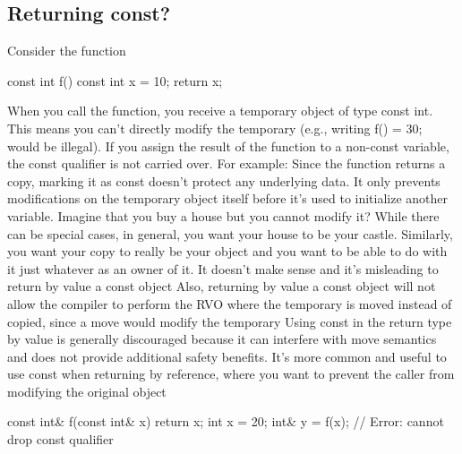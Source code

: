 \documentclass{report}
\begin{document}
\pagebreak 
{}
\bigbreak \noindent 
\subsection{Returning const?}
\bigbreak \noindent 
Consider the function
\bigbreak \noindent 
\begin{cppcode}
    const int f() {
        const int x = 10;
        return x;
    }
\end{cppcode}
\bigbreak \noindent 
When you call the function, you receive a temporary object of type const int. This means you can’t directly modify the temporary (e.g., writing f() = 30; would be illegal).
\bigbreak \noindent 
If you assign the result of the function to a non-const variable, the const qualifier is not carried over. For example:
\bigbreak \noindent 
Since the function returns a copy, marking it as const doesn’t protect any underlying data. It only prevents modifications on the temporary object itself before it’s used to initialize another variable.
\bigbreak \noindent 
Imagine that you buy a house but you cannot modify it? While
there can be special cases, in general, you want your house to be
your castle. Similarly, you want your copy to really be your object
and you want to be able to do with it just whatever as an owner of
it.
\bigbreak \noindent 
It doesn’t make sense and it’s misleading to return by value a const object
\bigbreak \noindent 
Also, returning by value a const object will not allow the compiler to perform the RVO where the temporary is moved instead of copied, since a move would modify the temporary
\bigbreak \noindent 
Using const in the return type by value is generally discouraged because it can interfere with move semantics and does not provide additional safety benefits. It’s more common and useful to use const when returning by reference, where you want to prevent the caller from modifying the original object
\bigbreak \noindent 
\begin{cppcode}
    const int& f(const int& x) {
        return x;
    }
    int x = 20;
    int& y = f(x); // Error: cannot drop const qualifier
\end{cppcode}

\bigbreak \noindent 
\end{document}
